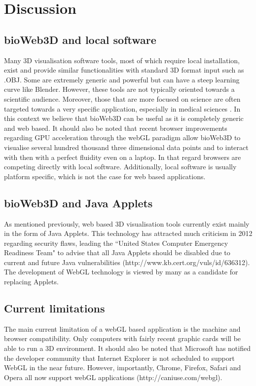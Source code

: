 \documentclass{bioinfo}
\begin{document}
\section{Discussion}
	\subsection{bioWeb3D and local software}
Many 3D visualisation software tools, most of which require local installation, exist and provide similar functionalities with standard 3D format input such as .OBJ. Some are extremely generic and powerful but can have a steep learning curve like Blender. However, these tools are not typically oriented towards a scientific audience. Moreover, those that are more focused on science are often targeted towards a very specific application, especially in medical sciences \citep{Wang09}. In this context we believe that bioWeb3D can be useful as it is completely generic and web based. It should also be noted that recent browser improvements regarding GPU acceleration through the webGL paradigm allow bioWeb3D to visualise several hundred thousand three dimensional data points and to interact with then with a perfect fluidity even on a laptop. In that regard browsers are competing directly with local software. Additionally, local software is usually platform specific, which is not the case for web based applications.

	\subsection{bioWeb3D and Java Applets}
As mentioned previously, web based 3D visualisation tools currently exist mainly in the form of Java Applets. This technology has attracted much criticism in 2012 regarding security flaws, leading the ``United States Computer Emergency Readiness Team" to advise that all Java Applets should be disabled due to current and future Java vulnerabilities (http://www.kb.cert.org/vuls/id/636312). The development of WebGL technology is viewed by many as a candidate for replacing Applets. 

	\subsection{Current limitations}
The main current limitation of a webGL based application is the machine and browser compatibility. Only computers with fairly recent graphic cards will be able to run a 3D environment. It should also be noted that Microsoft has notified the developer community that Internet Explorer is not scheduled to support WebGL in the near future. However, importantly, Chrome, Firefox, Safari and Opera all now support webGL applications (http://caniuse.com/webgl).
\end{document}
